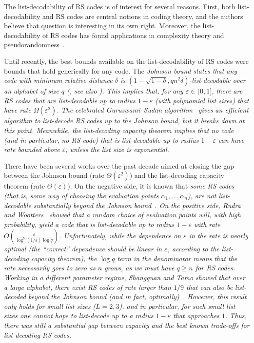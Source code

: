 \documentclass[11pt]{article}
\renewcommand{\epsilon}{\varepsilon}
\newcommand{\eps}{\epsilon}
\begin{document}
The list-decodability of RS codes is of interest for several reasons.  First, both list-decodability and RS codes are central notions in coding theory, and the authors believe that question is interesting in its own right.  Moreover, the list-decodability of RS codes has found applications in complexity theory and pseudorandomness~\cite{cai1999hardness, STV01,LP20}.

Until recently, the best bounds available on the list-decodability of RS codes were bounds that hold generically for any code.  The \em Johnson bound \em states that any code with minimum relative distance $\delta$ is $(1 - \sqrt{1 - \delta}, qn^2 \delta)$-list-decodable over an alphabet of size $q$ (\cite{johnson1962new}, see also \cite[Theorem~7.3.3]{guruswami2019essential}).
%
This implies that, for any $\eps\in (0,1]$, there are RS codes that are list-decodable up to radius $1 - \eps$ (with polynomial list sizes)  that have rate $\Omega(\eps^2)$.
The celebrated Guruswami--Sudan algorithm~\cite{gurus} gives an efficient algorithm to list-decode RS codes up to the Johnson bound, but it breaks down at this point.
%
Meanwhile, the \em list-decoding capacity theorem \em implies that  no code (and in particular, no RS code) that is list-decodable up to radius $1 - \eps$ can have rate bounded above $\eps$, unless the list size is exponential.

There have been several works over the past decade aimed at closing the
gap between the Johnson bound (rate $\Theta(\eps^2)$) and the list-decoding capacity theorem (rate $\Theta(\eps)$).
On the negative side, it is known that \em some \em RS codes (that is, some way of choosing the evaluation points $\alpha_1, \ldots, \alpha_n$), are not list-decodable substantially beyond the Johnson bound~\cite{Ben-Sasson}.
%
On the positive side, Rudra and Wootters~\cite{Rudra-Wootters} showed that a random choice of evaluation points will, with high probability, yield a code that is list-decodable up to radius $1 - \eps$ with rate $O\left( \frac{ \eps }{\log^5(1/\eps) \log q} \right)$.
Unfortunately, while the dependence on $\eps$ in the rate is nearly optimal (the ``correct'' dependence should be linear in $\eps$, according to the list-decoding capacity theorem),
the $\log q$ term in the denominator means that the rate necessarily goes to zero as $n$ grows, as we must have $q \geq n$ for RS codes.
%
Working in a different parameter regime, Shangguan and Tamo showed that over a large alphabet, there exist RS codes of rate larger than $1/9$ that can also be list-decoded beyond the Johnson bound (and in fact, optimally)~\cite{shangguan2019combinatorial0}.  However, this result only holds for small list sizes ($L=2,3$), and in particular, for such small list sizes one cannot hope to list-decode up to a radius $1 - \eps$ that approaches $1$.
%
Thus, there was still a substantial gap between capacity and the best known trade-offs for list-decoding RS codes.
\end{document}
